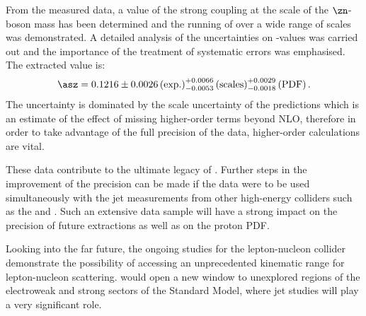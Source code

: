 From the measured data, a value of the strong coupling at the scale of the $\zn$-boson mass has been determined and the running of \as over a wide range of scales was demonstrated. A detailed analysis of the uncertainties on \asz-values was carried out and the importance of the treatment of systematic errors was emphasised. The extracted \asz value is:
\begin{equation}
 \asz = 0.1216 \pm 0.0026\left(\text{exp.}\right)^{+0.0066}_{-0.0053}\left(\text{scales}\right)^{+0.0029}_{-0.0018}\left(\text{PDF}\right).
\end{equation}
The uncertainty is dominated by the scale uncertainty of the predictions which is an estimate of the effect of missing higher-order terms beyond NLO, therefore in order to take advantage of the full precision of the data, higher-order calculations are vital. 

These data contribute to the ultimate legacy of \hera. Further steps in the improvement of the \asz precision can be made if the \hera data were to be used simultaneously with the jet measurements from other high-energy colliders such as the \lhc and \tevatron. Such an extensive data sample will have a strong impact on the precision of future \asz extractions as well as on the proton PDF.

Looking into the far future, the ongoing studies for the lepton-nucleon collider \lhec demonstrate the possibility of accessing an unprecedented kinematic range for lepton-nucleon scattering. \lhec would open a new window to unexplored regions of the electroweak and strong sectors of the Standard Model, where jet studies will play a very significant role.



